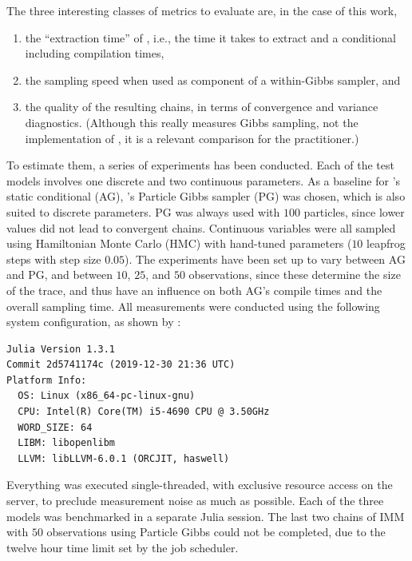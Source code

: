 The three interesting classes of metrics to evaluate are, in the case of this work,
\begin{enumerate}
  \firmlist
\item the \enquote{extraction time} of \autogibbsjl{}, i.e., the time it takes to extract and a
  conditional including compilation times,
\item the sampling speed when used as component of a within-Gibbs sampler, and
\item the quality of the resulting chains, in terms of convergence and variance diagnostics.
  (Although this really measures Gibbs sampling, not the implementation of \autogibbsjl{}, it is a
  relevant comparison for the practitioner.)
\end{enumerate}
To estimate them, a series of experiments has been conducted.  Each of the test models involves one
discrete and two continuous parameters.  As a baseline for \autogibbsjl{}'s static conditional (AG),
\turingjl{}'s Particle Gibbs sampler (PG) was chosen, which is also suited to discrete parameters.
PG was always used with \(100\) particles, since lower values did not lead to convergent chains.
Continuous variables were all sampled using Hamiltonian Monte Carlo (HMC) with hand-tuned parameters
(\(10\) leapfrog steps with step size \(0.05\)).  The experiments have been set up to vary between
AG and PG, and between \(10\), \(25\), and \(50\) observations, since these determine the size of
the trace, and thus have an influence on both AG's compile times and the overall sampling time.  All
measurements were conducted using the following system configuration, as shown by
:
\begin{lstlisting}
Julia Version 1.3.1
Commit 2d5741174c (2019-12-30 21:36 UTC)
Platform Info:
  OS: Linux (x86_64-pc-linux-gnu)
  CPU: Intel(R) Core(TM) i5-4690 CPU @ 3.50GHz
  WORD_SIZE: 64
  LIBM: libopenlibm
  LLVM: libLLVM-6.0.1 (ORCJIT, haswell)
\end{lstlisting}
Everything was executed single-threaded, with exclusive resource access on the server, to preclude
measurement noise as much as possible.  Each of the three models was benchmarked in a separate Julia
session.  The last two chains of IMM with \(50\) observations using Particle Gibbs could not be
completed, due to the twelve hour time limit set by the job scheduler.

\cleartoverso
\FloatBlock

